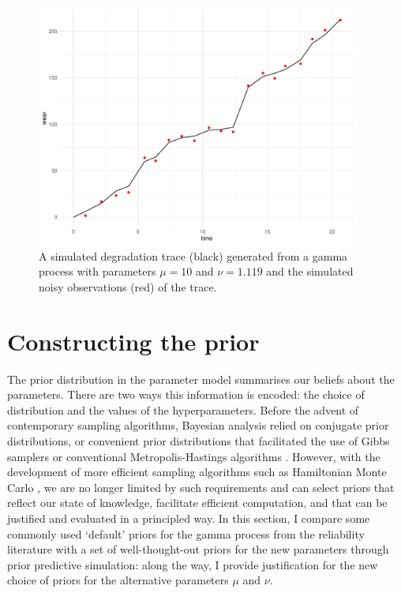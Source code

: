 \begin{figure}
  \centering
  \includegraphics[width=0.95\textwidth]{./figures/ch-4/SimData.pdf}
  \caption{A simulated degradation trace (black) generated from a gamma process with parameters $\mu = 10$ and $\nu = 1.119$ and the simulated noisy observations (red) of the trace.}
  \label{fig:sim-data}
\end{figure}

\section{Constructing the prior} \label{sec:GP_priors}

The prior distribution in the parameter model summarises our beliefs about the parameters. There are two ways this information is encoded: the choice of distribution and the values of the hyperparameters. Before the advent of contemporary sampling algorithms, Bayesian analysis relied on conjugate prior distributions, or convenient prior distributions that facilitated the use of Gibbs samplers or conventional Metropolis-Hastings algorithms \citep{gilks_1996}. However, with the development of more efficient sampling algorithms such as Hamiltonian Monte Carlo \citep{betancourt_2017}, we are no longer limited by such requirements and can select priors that reflect our state of knowledge, facilitate efficient computation, and that can be justified and evaluated in a principled way. In this section, I compare some commonly used `default' priors for the gamma process from the reliability literature with a set of well-thought-out priors for the new parameters through prior predictive simulation: along the way, I provide justification for the new choice of priors for the alternative parameters $\mu$ and $\nu$.

